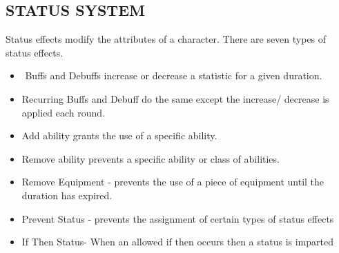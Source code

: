 \subsection{STATUS SYSTEM}
Status effects modify the attributes of a character.  There are seven types of status effects.  
\begin{itemize}
\item	Buffs and Debuffs increase or decrease a statistic for a given duration.  
\item Recurring Buffs and Debuff do the same except the increase/
decrease is applied each round.
\item Add ability grants the use of a specific ability.
\item Remove ability prevents a specific ability or class of abilities.
\item Remove Equipment - prevents the use of a piece of equipment until the duration has expired.
\item Prevent Status - prevents the assignment of certain types of status effects
\item If Then Status- When an allowed if then occurs then a status is imparted
\end{itemize}
